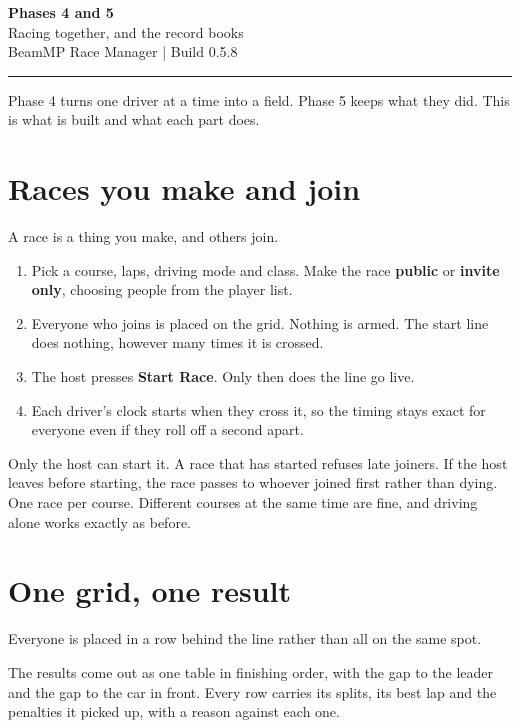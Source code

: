 \documentclass[11pt,a4paper]{article}
\begin{document}
\begin{center}
{\LARGE\bfseries Phases 4 and 5}\\[4pt]
{\large Racing together, and the record books}\\[8pt]
{\small BeamMP Race Manager \quad | \quad Build 0.5.8}
\end{center}

\vspace{6pt}
\hrule
\vspace{10pt}

Phase 4 turns one driver at a time into a field. Phase 5 keeps what they
did. This is what is built and what each part does.

\section{Races you make and join}

A race is a thing you make, and others join.

\begin{enumerate}
  \item Pick a course, laps, driving mode and class. Make the race
        \textbf{public} or \textbf{invite only}, choosing people from the
        player list.
  \item Everyone who joins is placed on the grid. Nothing is armed. The start
        line does nothing, however many times it is crossed.
  \item The host presses \textbf{Start Race}. Only then does the line go live.
  \item Each driver's clock starts when they cross it, so the timing stays
        exact for everyone even if they roll off a second apart.
\end{enumerate}

Only the host can start it. A race that has started refuses late joiners. If
the host leaves before starting, the race passes to whoever joined first
rather than dying. One race per course. Different courses at the same time
are fine, and driving alone works exactly as before.

\section{One grid, one result}

Everyone is placed in a row behind the line rather than all on the same spot.

The results come out as one table in finishing order, with the gap to the
leader and the gap to the car in front. Every row carries its splits, its
best lap and the penalties it picked up, with a reason against each one.
\end{document}
